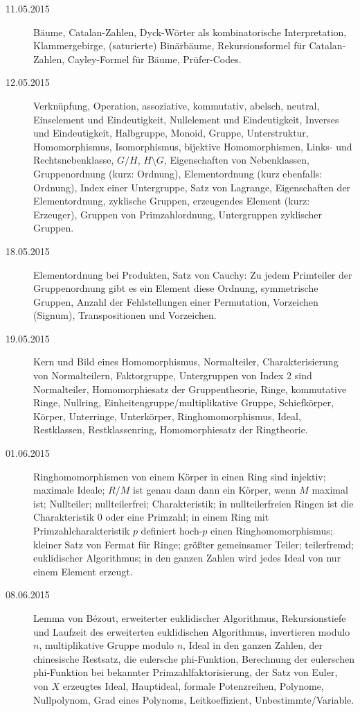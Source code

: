 \documentclass{mywork}
\begin{document}
\begin{description}
    \item[11.05.2015]
        Bäume, Catalan-Zahlen, Dyck-Wörter als kombinatorische Interpretation, Klammergebirge, (saturierte) Binärbäume, Rekursionsformel für Catalan-Zahlen, Cayley-Formel für Bäume, Prüfer-Codes.
    \item[12.05.2015]
        Verknüpfung, Operation, assoziative, kommutativ, abelsch, neutral, Einselement und Eindeutigkeit, Nullelement und Eindeutigkeit, Inverses und Eindeutigkeit, Halbgruppe, Monoid, Gruppe, Unterstruktur, Homomorphismus, Isomorphismus, bijektive Homomorphismen, Links- und Rechtsnebenklasse, $G/H$, $H \setminus G$, Eigenschaften von Nebenklassen, Gruppenordnung (kurz: Ordnung), Elementordnung (kurz ebenfalls: Ordnung), Index einer Untergruppe, Satz von Lagrange, Eigenschaften der Elementordnung, zyklische Gruppen, erzeugendes Element (kurz: Erzeuger), Gruppen von Primzahlordnung, Untergruppen zyklischer Gruppen.
    \item[18.05.2015]
        Elementordnung bei Produkten, Satz von Cauchy: Zu jedem Primteiler der Gruppenordnung gibt es ein Element diese Ordnung, symmetrische Gruppen, Anzahl der Fehlstellungen einer Permutation, Vorzeichen (Signum), Transpositionen und Vorzeichen.
    \item[19.05.2015]
        Kern und Bild eines Homomorphismus, Normalteiler, Charakterisierung von Normalteilern, Faktorgruppe, Untergruppen von Index 2 sind Normalteiler, Homomorphiesatz der Gruppentheorie, Ringe, kommutative Ringe, Nullring, Einheitengruppe/multiplikative Gruppe, Schiefkörper, Körper, Unterringe, Unterkörper, Ringhomomorphismus, Ideal, Restklassen, Restklassenring, Homomorphiesatz der Ringtheorie.
    \item[01.06.2015]
        Ringhomomorphismen von einem Körper in einen Ring sind injektiv; maximale Ideale; $R/M$ ist genau dann dann ein Körper, wenn $M$ maximal ist; Nullteiler; nullteilerfrei; Charakteristik; in nullteilerfreien Ringen ist die Charakteristik 0 oder eine Primzahl; in einem Ring mit Primzahlcharakteristik $p$ definiert hoch-$p$ einen Ringhomomorphismus; kleiner Satz von Fermat für Ringe; größter gemeinsamer Teiler; teilerfremd; euklidischer Algorithmus; in den ganzen Zahlen wird jedes Ideal von nur einem Element erzeugt.
    \item[08.06.2015]
        Lemma von Bézout, erweiterter euklidischer Algorithmus, Rekursionstiefe und Laufzeit des erweiterten euklidischen Algorithmus, invertieren modulo $n$, multiplikative Gruppe modulo $n$, Ideal in den ganzen Zahlen, der chinesische Restsatz, die eulersche phi-Funktion, Berechnung der eulerschen phi-Funktion bei bekannter Primzahlfaktorisierung, der Satz von Euler, von $X$ erzeugtes Ideal, Hauptideal, formale Potenzreihen, Polynome, Nullpolynom, Grad eines Polynoms, Leitkoeffizient, Unbestimmte/Variable.

\end{description}
\end{document}
